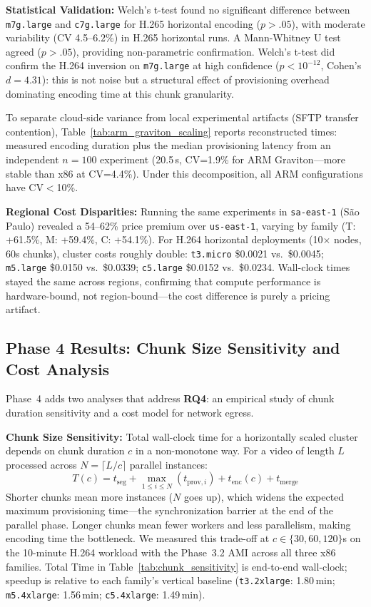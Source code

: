 \documentclass[conference]{IEEEtran}
\begin{document}
\textbf{Statistical Validation:} Welch's t-test found no significant difference between \texttt{m7g.large} and \texttt{c7g.large} for H.265 horizontal encoding ($p > .05$), with moderate variability (CV 4.5--6.2\%) in H.265 horizontal runs. A Mann-Whitney U test agreed ($p > .05$), providing non-parametric confirmation. Welch's t-test did confirm the H.264 inversion on \texttt{m7g.large} at high confidence ($p < 10^{-12}$, Cohen's $d = 4.31$): this is not noise but a structural effect of provisioning overhead dominating encoding time at this chunk granularity.

To separate cloud-side variance from local experimental artifacts (SFTP transfer contention), Table~\ref{tab:arm_graviton_scaling} reports reconstructed times: measured encoding duration plus the median provisioning latency from an independent $n=100$ experiment (20.5\,s, CV=1.9\% for ARM Graviton---more stable than x86 at CV=4.4\%). Under this decomposition, all ARM configurations have CV$<$10\%.

\textbf{Regional Cost Disparities:} Running the same experiments in \texttt{sa-east-1} (S\~{a}o Paulo) revealed a 54--62\% price premium over \texttt{us-east-1}, varying by family (T: +61.5\%, M: +59.4\%, C: +54.1\%). For H.264 horizontal deployments (10$\times$ nodes, 60s chunks), cluster costs roughly double: \texttt{t3.micro} \$0.0021 vs.\ \$0.0045; \texttt{m5.large} \$0.0150 vs.\ \$0.0339; \texttt{c5.large} \$0.0152 vs.\ \$0.0234. Wall-clock times stayed the same across regions, confirming that compute performance is hardware-bound, not region-bound---the cost difference is purely a pricing artifact.

\subsection{Phase 4 Results: Chunk Size Sensitivity and Cost Analysis}
\label{results-phase4}

Phase~4 adds two analyses that address \textbf{RQ4}: an empirical study of chunk duration sensitivity and a cost model for network egress.

\textbf{Chunk Size Sensitivity:}
Total wall-clock time for a horizontally scaled cluster depends on chunk duration $c$ in a non-monotone way. For a video of length $L$ processed across $N = \lceil L/c \rceil$ parallel instances:
\begin{equation}
T(c) = t_{\text{seg}} + \max_{1 \le i \le N} \left( t_{\text{prov},i} \right) + t_{\text{enc}}(c) + t_{\text{merge}}
\end{equation}
Shorter chunks mean more instances ($N$ goes up), which widens the expected maximum provisioning time---the synchronization barrier at the end of the parallel phase. Longer chunks mean fewer workers and less parallelism, making encoding time the bottleneck. We measured this trade-off at $c \in \{30, 60, 120\}$s on the 10-minute H.264 workload with the Phase~3.2 AMI across all three x86 families. Total Time in Table~\ref{tab:chunk_sensitivity} is end-to-end wall-clock; speedup is relative to each family's vertical baseline (\texttt{t3.2xlarge}: 1.80\,min; \texttt{m5.4xlarge}: 1.56\,min; \texttt{c5.4xlarge}: 1.49\,min).
\end{document}
